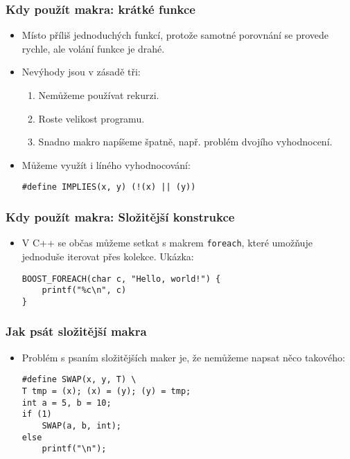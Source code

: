 \documentclass{beamer}
\newenvironment{itemizex}%
  {\large \begin{itemize}%
    \setlength{\itemsep}{8pt}%
    \setlength{\parskip}{8pt}}%
  {\end{itemize}}
\begin{document}
\begin{frame}[t,fragile]\frametitle{Kdy použít makra: krátké funkce} 
    \begin{itemizex}
        \item Místo příliš jednoduchých funkcí, protože samotné porovnání se provede rychle, ale volání funkce je drahé.
        \item Nevýhody jsou v zásadě tři:
        \begin{enumerate}
            \item Nemůžeme používat rekurzi.
            \item Roste velikost programu. 
            \item Snadno makro napíšeme špatně, např. problém dvojího vyhodnocení.
        \end{enumerate}
        \item Můžeme využít i líného vyhodnocování:
        \begin{verbatim} 
#define IMPLIES(x, y) (!(x) || (y))
        \end{verbatim}
    \end{itemizex}
\end{frame}


\begin{frame}[t,fragile]\frametitle{Kdy použít makra: Složitější konstrukce} 
\begin{itemizex}
    \item V C++ se občas můžeme setkat s makrem \texttt{foreach}, které umožňuje jednoduše iterovat přes kolekce. Ukázka:
\begin{verbatim} 
BOOST_FOREACH(char c, "Hello, world!") {
    printf("%c\n", c)
}
\end{verbatim}
\end{itemizex}

\end{frame}



\begin{frame}[t,fragile]\frametitle{Jak psát složitější makra} 
\begin{itemizex}
    \item Problém s psaním složitějších maker je, že nemůžeme napsat něco takového:
\begin{verbatim} 
#define SWAP(x, y, T) \
T tmp = (x); (x) = (y); (y) = tmp;
int a = 5, b = 10;
if (1)
    SWAP(a, b, int);
else
    printf("\n");
\end{verbatim}
\end{itemizex}
\end{frame}
\end{document}
